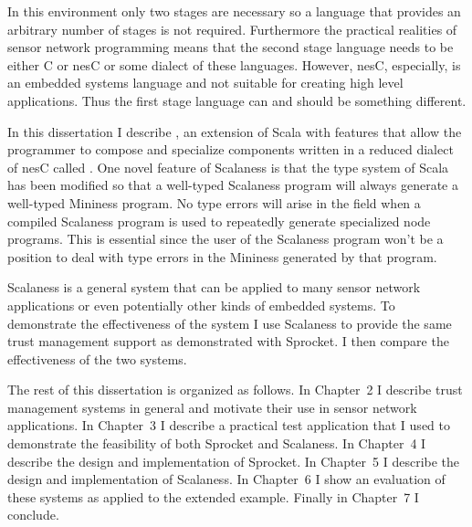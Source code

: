In this environment only two stages are necessary so a language that provides an arbitrary
number of stages is not required. Furthermore the practical realities of sensor network
programming means that the second stage language needs to be either C or nesC or some dialect of
these languages. However, nesC, especially, is an embedded systems language and not suitable for
creating high level applications. Thus the first stage language can and should be something
different.

In this dissertation I describe , an extension of Scala \cite{PiS2} with
features that allow the programmer to compose and specialize components written in a reduced
dialect of nesC called . One novel feature of Scalaness is that the type
system of Scala has been modified so that a well-typed Scalaness program will always generate a
well-typed Mininess program. No type errors will arise in the field when a compiled Scalaness
program is used to repeatedly generate specialized node programs. This is essential since the
user of the Scalaness program won't be a position to deal with type errors in the Mininess
generated by that program.

Scalaness is a general system that can be applied to many sensor network applications or even
potentially other kinds of embedded systems. To demonstrate the effectiveness of the system I
use Scalaness to provide the same trust management support as demonstrated with Sprocket. I then
compare the effectiveness of the two systems.

The rest of this dissertation is organized as follows. In Chapter~2 I describe trust management
systems in general and motivate their use in sensor network applications. In Chapter~3 I
describe a practical test application that I used to demonstrate the feasibility of both
Sprocket and Scalaness. In Chapter~4 I describe the design and implementation of Sprocket. In
Chapter~5 I describe the design and implementation of Scalaness. In Chapter~6 I show an
evaluation of these systems as applied to the extended example. Finally in Chapter~7 I conclude.

